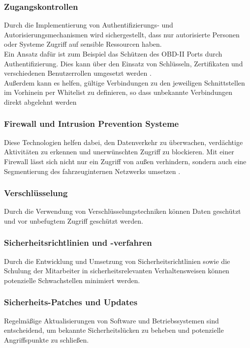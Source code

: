 \subsubsection{Zugangskontrollen}
Durch die Implementierung von Authentifizierungs- und Autorisierungsmechanismen wird sichergestellt, dass nur autorisierte Personen oder Systeme Zugriff auf sensible Ressourcen haben.\\
Ein Ansatz dafür ist zum Beispiel das Schützen des \acs{OBD}-II Ports durch Authentifizierung. Dies kann über den Einsatz von Schlüsseln, Zertifikaten und verschiedenen Benutzerrollen umgesetzt werden \cite[133]{Wurm.2022}.\\
Außerdem kann es helfen, gültige Verbindungen zu den jeweiligen Schnittstellen im Vorhinein per Whitelist zu definieren, so dass unbekannte Verbindungen direkt abgelehnt werden \cite[185]{Wurm.2022}


\subsubsection{Firewall und Intrusion Prevention Systeme}
Diese Technologien helfen dabei, den Datenverkehr zu überwachen, verdächtige Aktivitäten zu erkennen und unerwünschten Zugriff zu blockieren.
Mit einer Firewall lässt sich nicht nur ein Zugriff von außen verhindern, sondern auch eine Segmentierung des fahrzeuginternen Netzwerks umsetzen \cite[147]{Wurm.2022}.


\subsubsection{Verschlüsselung}
Durch die Verwendung von Verschlüsselungstechniken können Daten geschützt und vor unbefugtem Zugriff geschützt werden.

\subsubsection{Sicherheitsrichtlinien und -verfahren}
Durch die Entwicklung und Umsetzung von Sicherheitsrichtlinien sowie die Schulung der Mitarbeiter in sicherheitsrelevanten Verhaltensweisen können potenzielle Schwachstellen minimiert werden.

\subsubsection{Sicherheits-Patches und Updates} 
Regelmäßige Aktualisierungen von Software und Betriebssystemen sind entscheidend, um bekannte Sicherheitslücken zu beheben und potenzielle Angriffspunkte zu schließen.

